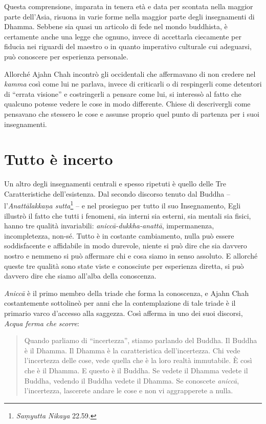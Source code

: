 Questa comprensione, imparata in tenera età e data per scontata nella
maggior parte dell'Asia, risuona in varie forme nella maggior parte
degli insegnamenti di Dhamma. Sebbene sia quasi un articolo di fede nel
mondo buddhista, è certamente anche una legge che ognuno, invece di
accettarla ciecamente per fiducia nei riguardi del maestro o in quanto
imperativo culturale cui adeguarsi, può conoscere per esperienza
personale.

Allorché Ajahn Chah incontrò gli occidentali che affermavano di non
credere nel \emph{kamma} così come lui ne parlava, invece di criticarli
o di respingerli come detentori di ``errata visione'' e costringerli a
pensare come lui, si interessò al fatto che qualcuno potesse vedere le
cose in modo differente. Chiese di descrivergli come pensavano che
stessero le cose e assunse proprio quel punto di partenza per i suoi
insegnamenti.

\section{Tutto è incerto}

Un altro degli insegnamenti centrali e spesso ripetuti è quello delle
Tre Caratteristiche dell'esistenza. Dal secondo discorso tenuto dal
Buddha -- l'\emph{Anattālakkaṇa sutta}\footnote{\emph{Saṃyutta Nikaya}
  22.59.} -- e nel prosieguo per tutto il suo Insegnamento, Egli
illustrò il fatto che tutti i fenomeni, sia interni sia esterni, sia
mentali sia fisici, hanno tre qualità invariabili:
\emph{aniccā-dukkha-anattā}, impermanenza, incompletezza, non-sé. Tutto
è in costante cambiamento, nulla può essere soddisfacente e affidabile
in modo durevole, niente si può dire che sia davvero nostro e nemmeno si
può affermare chi e cosa siamo in senso assoluto. E allorché queste tre
qualità sono state viste e conosciute per esperienza diretta, si può
davvero dire che siamo all'alba della conoscenza.

\emph{Aniccā} è il primo membro della triade che forma la conoscenza, e
Ajahn Chah costantemente sottolineò per anni che la contemplazione di
tale triade è il primario varco d'accesso alla saggezza. Così afferma in
uno dei suoi discorsi, \emph{Acqua ferma che scorre}:

\begin{quote}
Quando parliamo di ``incertezza'', stiamo parlando del Buddha. Il Buddha
è il Dhamma. Il Dhamma è la caratteristica dell'incertezza. Chi vede
l'incertezza delle cose, vede quella che è la loro realtà immutabile. È
così che è il Dhamma. E questo è il Buddha. Se vedete il Dhamma vedete
il Buddha, vedendo il Buddha vedete il Dhamma. Se conoscete
\emph{aniccā}, l'incertezza, lascerete andare le cose e non vi
aggrapperete a nulla.
\end{quote}

